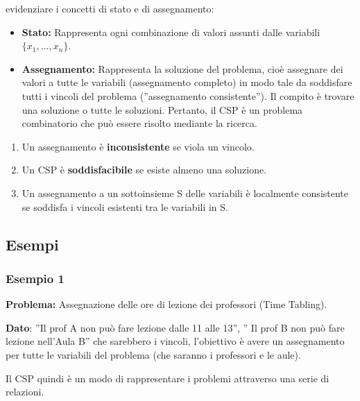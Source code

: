evidenziare i concetti di stato e di assegnamento:
\begin{itemize}
    \item \textbf{Stato:} Rappresenta ogni combinazione di valori assunti dalle
          variabili $\{x_1, \ldots, x_n\}$.
    \item \textbf{Assegnamento:} Rappresenta la soluzione del problema, cioè
          assegnare dei valori a tutte le variabili (assegnamento completo) in modo
          tale da soddisfare tutti i vincoli del problema (”assegnamento
          consistente”). Il compito è trovare una soluzione o tutte le soluzioni.
          Pertanto, il CSP è un problema combinatorio che può essere risolto mediante
          la ricerca.
\end{itemize}
\begin{enumerate}
    \item Un assegnamento è \textbf{inconsistente} se viola un vincolo.
    \item Un CSP è \textbf{soddisfacibile} se esiste almeno una soluzione.
    \item Un assegnamento a un sottoinsieme S delle variabili è localmente
          consistente se soddisfa i vincoli esistenti tra le variabili in S.
\end{enumerate}

\subsection{Esempi}
\subsubsection{Esempio 1}
\textbf{Problema:} Assegnazione delle ore di lezione dei professori (Time
Tabling).

\vspace{0.2cm}

\noindent \textbf{Dato}: ”Il prof A non può fare lezione dalle 11 alle 13”, ” Il
prof B non può fare lezione nell'Aula B” che sarebbero i vincoli, l'obiettivo è
avere un assegnamento per tutte le variabili del problema (che saranno i
professori e le aule).
\vspace{0.2cm}

\noindent Il CSP quindi è un modo di rappresentare i problemi attraverso una
serie di relazioni.
\vspace{0.2cm}

